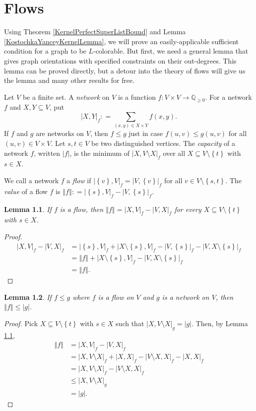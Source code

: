 \documentclass[openany]{tufte-book} %
\theoremstyle{plain}
\newtheorem{lemma}{Lemma}
\newcommand{\set}[1]{\left\{ #1 \right\}}
\newcommand{\card}[1]{\left|#1\right|}
\newcommand{\size}[1]{\left\Vert#1\right\Vert}
\newcommand{\func}[3]{#1\colon #2 \rightarrow #3}
\newcommand{\DefinedAs}{\mathrel{\mathop:}=}
\newcommand{\Q}{\mathbb{Q}}
\begin{document}
\chapter{Flows}
Using Theorem \ref{KernelPerfectSuperListBound} and Lemma \ref{KostochkaYanceyKernelLemma}, we will prove an easily-applicable sufficient condition for a graph to be $L$-colorable.  
But first, we need a general lemma that gives graph orientations with specified constraints on their out-degrees.  This lemma can be proved directly, 
but a detour into the theory of flows will give us the lemma and many other results for free.

Let $V$ be a finite set.  A \emph{network} on $V$ is a function $\func{f}{V\times V}{\Q_{\ge 0}}$.  For a network $f$ and $X,Y \subseteq V$, put
\[\card{X,Y}_f \DefinedAs \sum_{(x,y) \in X\times Y} f(x,y).\]
If $f$ and $g$ are networks on $V$, then $f \le g$ just in case $f(u,v) \le g(u,v)$ for all $(u,v)\in V\times V$.
Let $s,t \in V$ be two distinguished vertices.  The \emph{capacity} of a network $f$, written $\card{f}$, is the minimum of $\card{X, V\setminus X}_f$ over all $X \subseteq V\setminus\set{t}$ with $s \in X$.

We call a network $f$ a \emph{flow} if $\card{\set{v},V}_f = \card{V,\set{v}}_f$ for all $v \in V \setminus \set{s,t}$.
The \emph{value} of a flow $f$ is $\size{f} \DefinedAs \card{\set{s},V}_f - \card{V,\set{s}}_f$.

\begin{lemma}\label{FlowValues}
If $f$ is a flow, then $\size{f} = \card{X, V}_f - \card{V, X}_f$ for every $X \subseteq V\setminus\set{t}$ with $s \in X$.
\end{lemma}
\begin{proof}
\begin{align*}
\card{X, V}_f - \card{V, X}_f &= \card{\set{s}, V}_f + \card{X\setminus\set{s}, V}_f - \card{V, \set{s}}_f - \card{V, X\setminus\set{s}}_f\\
&= \size{f} + \card{X\setminus\set{s}, V}_f - \card{V, X\setminus\set{s}}_f\\
&= \size{f}.
\end{align*}
\end{proof}

\begin{lemma}\label{FlowAtMostCapacity}
If $f \le g$ where $f$ is a flow on $V$ and $g$ is a network on $V$, then $\size{f} \le \card{g}$.
\end{lemma}
\begin{proof}
Pick $X \subseteq V\setminus\set{t}$ with $s \in X$ such that $\card{X, V\setminus X}_g = \card{g}$.  Then, by Lemma \ref{FlowValues}, 
\begin{align*}
\size{f} &= \card{X, V}_f - \card{V, X}_f \\
&= \card{X, V\setminus X}_f + \card{X,X}_f - \card{V\setminus X, X}_f - \card{X,X}_f \\
&= \card{X, V\setminus X}_f - \card{V\setminus X, X}_f\\
&\le \card{X, V\setminus X}_g \\
&= \card{g}.
\end{align*}
\end{proof}
\end{document}
